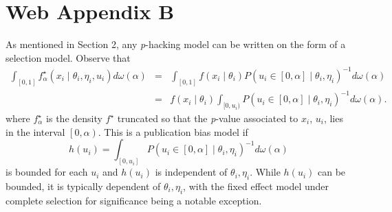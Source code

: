 \section*{Web Appendix B}

As mentioned in Section 2, any \textit{p}-hacking model can be written on the form of a selection model. Observe that
\begin{eqnarray*}
\int_{[0,1]}f_\alpha^{\star}(x_{i}\mid\theta_{i},\eta_{i}, u_i)d\omega(\alpha) & = & \int_{[0,1]}f(x_{i}\mid\theta_{i})P(u_i\in\left[0,\alpha\right]\mid\theta_{i},\eta_{i})^{-1}d\omega(\alpha)\\
 & = & f(x_{i}\mid\theta_{i})\int_{[0,u_i)}P(u_i\in\left[0,\alpha\right]\mid\theta_{i},\eta_{i})^{-1}d\omega(\alpha).
\end{eqnarray*}
where $f_\alpha^{\star}$ is the density $f^{\star}$ truncated so that the \textit{p}-value associated to $x_i$, $u_i$, lies in the interval $\left[0,\alpha\right)$. This is a publication bias model if $$h(u_i)=\int_{[0,u_i]}P(u_i\in\left[0,\alpha\right]\mid\theta_{i},\eta_{i})^{-1}d\omega(\alpha)$$ is bounded for each $u_i$ and $h(u_i)$ is independent of $\theta_{i},\eta_{i}$. While $h(u_i)$ can be bounded, it is typically dependent of $\theta_{i},\eta_{i}$, with the fixed effect model under complete selection for significance being a notable exception.

